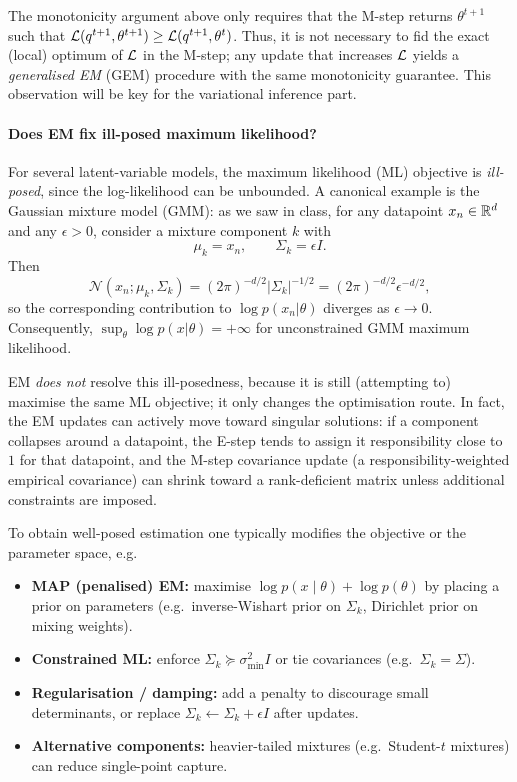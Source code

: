 \begin{remark}[Generalised EM]
The monotonicity argument above only requires that the M-step returns
$\theta^{t+1}$ such that ${\mathcal L}(q^{t+1},\theta^{t+1})\ge {\mathcal L}(q^{t+1},\theta^{t})$.
Thus, it is not necessary to fid the exact (local) optimum of ${\mathcal L}$ in the M-step; any update that increases
${\mathcal L}$ yields a \emph{generalised EM} (GEM) procedure with the same monotonicity guarantee. This observation will be key for the variational inference part.
\end{remark}

\paragraph{Does EM fix ill-posed maximum likelihood?}
For several latent-variable models, the maximum likelihood (ML) objective is \emph{ill-posed}, since the log-likelihood can be unbounded. A canonical example is the Gaussian mixture model (GMM): as we saw in class, for any datapoint $x_n\in{\mathbb R}^d$ and any $\epsilon>0$, consider a mixture component $k$ with
\[
\mu_k = x_n,
\qquad
\Sigma_k = \epsilon I.
\]
Then
\[
\mathcal N(x_n;\mu_k,\Sigma_k)
= (2\pi)^{-d/2}|\Sigma_k|^{-1/2}
= (2\pi)^{-d/2}\epsilon^{-d/2},
\]
so the corresponding contribution to $\log p(x_n| \theta)$ diverges as $\epsilon\to 0$.
Consequently, $\sup_{\theta}\log p(x| \theta)=+\infty$ for unconstrained GMM maximum likelihood.

EM \emph{does not} resolve this ill-posedness, because it is still (attempting to) maximise the same ML
objective; it only changes the optimisation route. In fact, the EM updates can actively move toward
singular solutions:
if a component collapses around a datapoint, the E-step tends to assign it responsibility close to $1$
for that datapoint, and the M-step covariance update (a responsibility-weighted empirical covariance)
can shrink toward a rank-deficient matrix unless additional constraints are imposed.

\begin{remark}
To obtain well-posed estimation one typically modifies the objective or the parameter space, e.g.
\begin{itemize}
\item \textbf{MAP (penalised) EM:} maximise $\log p(x\mid \theta)+\log p(\theta)$ by placing a prior on
      parameters (e.g.\ inverse-Wishart prior on $\Sigma_k$, Dirichlet prior on mixing weights).
\item \textbf{Constrained ML:} enforce $\Sigma_k\succeq \sigma_{\min}^2 I$ or tie covariances (e.g.\ $\Sigma_k=\Sigma$).
\item \textbf{Regularisation / damping:} add a penalty to discourage small determinants, or replace $\Sigma_k\leftarrow \Sigma_k+\epsilon I$ after updates.
\item \textbf{Alternative components:} heavier-tailed mixtures (e.g.\ Student-$t$ mixtures) can reduce single-point capture.
\end{itemize}
\end{remark}

